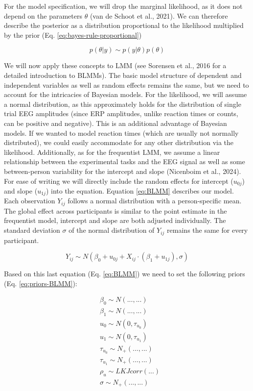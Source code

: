 \documentclass[
  doc,12pt,floatsintext]{apa7}
\begin{document}
For the model specification, we will drop the marginal likelihood, as it does not depend on the parameters \(\theta\) (van de Schoot et al., 2021). We can therefore describe the posterior as a distribution proportional to the likelihood multiplied by the prior (Eq. \eqref{eq:bayes-rule-proportional})

\begin{equation}
p(\theta|y) \sim p(y|\theta)p(\theta)
\label{eq:bayes-rule-proportional}
\end{equation}

We will now apply these concepts to LMM (see Sorensen et al., 2016 for a detailed introduction to BLMMs). The basic model structure of dependent and independent variables as well as random effects remains the same, but we need to account for the intricacies of Bayesian models. For the likelihood, we will assume a normal distribution, as this approximately holds for the distribution of single trial EEG amplitudes (since ERP amplitudes, unlike reaction times or counts, can be positive and negative). This is an additional advantage of Bayesian models. If we wanted to model reaction times (which are usually not normally distributed), we could easily accommodate for any other distribution via the likelihood. Additionally, as for the frequentist LMM, we assume a linear relationship between the experimental tasks and the EEG signal as well as some between-person variability for the intercept and slope (Nicenboim et al., 2024). For ease of writing we will directly include the random effects for intercept (\(u_{0j}\)) and slope (\(u_{1j}\)) into the equation. Equation \eqref{eq:BLMM} describes our model. Each observation \(Y_{ij}\) follows a normal distribution with a person-specific mean. The global effect across participants is similar to the point estimate in the frequentist model, intercept and slope are both adjusted individually. The standard deviation \(\sigma\) of the normal distribution of \(Y_{ij}\) remains the same for every participant.

\begin{equation}
Y_{ij} \sim N(\beta_{0} + u_{0j} + X_{ij} \cdot (\beta_{1} + u_{1j}), \sigma)
\label{eq:BLMM}
\end{equation}

Based on this last equation (Eq. \eqref{eq:BLMM}) we need to set the following priors (Eq. \eqref{eq:priors-BLMM}):

\begin{equation}
\begin{split}
& \beta_{0} \sim N(...,...) \\
& \beta_{1} \sim N(...,...) \\
& u_0 \sim N(0,\tau_{u_0}) \\
& u_1 \sim N(0,\tau_{u_1}) \\
& \tau_{u_0} \sim N_+(...,...) \\
& \tau_{u_1} \sim N_+(...,...) \\
& \rho_u \sim LKJcorr(...) \\
& \sigma \sim N_+(...,...)
\end{split}
\label{eq:priors-BLMM}
\end{equation}
\end{document}
